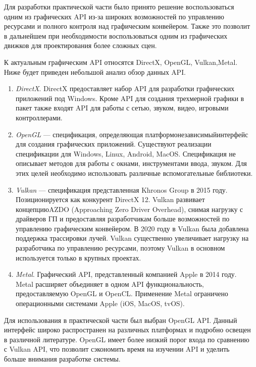 Для разработки практической части было принято решение воспользоваться одним из
графических API из-за широких возможностей по управлению ресурсами и полного
контроля над графическим конвейером. Также это позволит в дальнейшем при
необходимости воспользоваться одним из графических движков для проектирования
более сложных сцен.

К актуальным графическим API относятся DirectX, OpenGL, Vulkan,\break{}Metal. Ниже
будет приведен небольшой анализ обзор данных API\@.
\begin{enumerate}
    \item \emph{DirectX}. DirectX предоставляет набор API для разработки
        графических приложений под Windows. Кроме API для создания трехмерной
        графики в пакет также входят API для работы с сетью, звуком, видео,
        игровыми контроллерами.
    \item \emph{OpenGL} --- спецификация, определяющая
        платформонезависимый\break{}интерфейс для создания графических
        приложений. Существуют реализации спецификации для Windows, Linux,
        Android, MacOS\@. Спецификация не описывает методов для работы с окнами,
        инструментами ввода, звуком. Для этих целей необходимо использовать
        различные вспомогательные библиотеки.
    \item \emph{Vulkan} --- спецификация представленная Khronos Group в 2015 году.
        Позиционируется как конкурент DirectX 12. Vulkan развивает
        концепцию\break{}AZDO (Approaching Zero Driver Overhead), снимая
        нагрузку с драйверов ГП и предоставляя разработчикам больше возможностей
        по управлению графическим конвейером. В 2020 году в Vulkan была
        добавлена поддержка трассировки лучей. Vulkan существенно увеличивает
        нагрузку на разработчика по управлению ресурсами, поэтому Vulkan в
        основном используется только в крупных проектах.
    \item \emph{Metal}. Графический API, представленный компанией Apple в 2014
        году. Metal расширяет объединяет в одном API функциональность,
        предоставляемую OpenGL и OpenCL\@. Применение Metal ограничено
        операционными системами Apple (iOS, MacOS, tvOS).
\end{enumerate}

Для использования в практической части был выбран OpenGL API\@. Данный интерфейс
широко распространен на различных платформах и подробно освещен в различной
литературе. OpenGL имеет более низкий порог входа по сравнению с Vulkan API, что
позволит сэкономить время на изучении API и уделить больше внимания
разработке системы.


